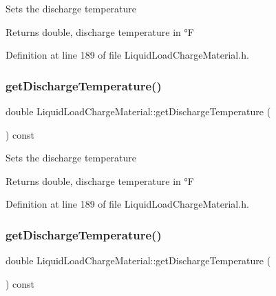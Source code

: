Sets the discharge temperature \begin{DoxyReturn}{Returns}
double, discharge temperature in °F 
\end{DoxyReturn}


Definition at line 189 of file Liquid\+Load\+Charge\+Material.\+h.

\mbox{\label{class_liquid_load_charge_material_ad474f33059c99aa94e1d63738e11ff0e}} 
\subsubsection{\texorpdfstring{get\+Discharge\+Temperature()}{getDischargeTemperature()}\hspace{0.1cm}{\footnotesize\ttfamily [2/3]}}
{\footnotesize\ttfamily double Liquid\+Load\+Charge\+Material\+::get\+Discharge\+Temperature (\begin{DoxyParamCaption}{ }\end{DoxyParamCaption}) const\hspace{0.3cm}{\ttfamily [inline]}}

Sets the discharge temperature \begin{DoxyReturn}{Returns}
double, discharge temperature in °F 
\end{DoxyReturn}


Definition at line 189 of file Liquid\+Load\+Charge\+Material.\+h.

\mbox{\label{class_liquid_load_charge_material_ad474f33059c99aa94e1d63738e11ff0e}} 
\subsubsection{\texorpdfstring{get\+Discharge\+Temperature()}{getDischargeTemperature()}\hspace{0.1cm}{\footnotesize\ttfamily [3/3]}}
{\footnotesize\ttfamily double Liquid\+Load\+Charge\+Material\+::get\+Discharge\+Temperature (\begin{DoxyParamCaption}{ }\end{DoxyParamCaption}) const\hspace{0.3cm}{\ttfamily [inline]}}

